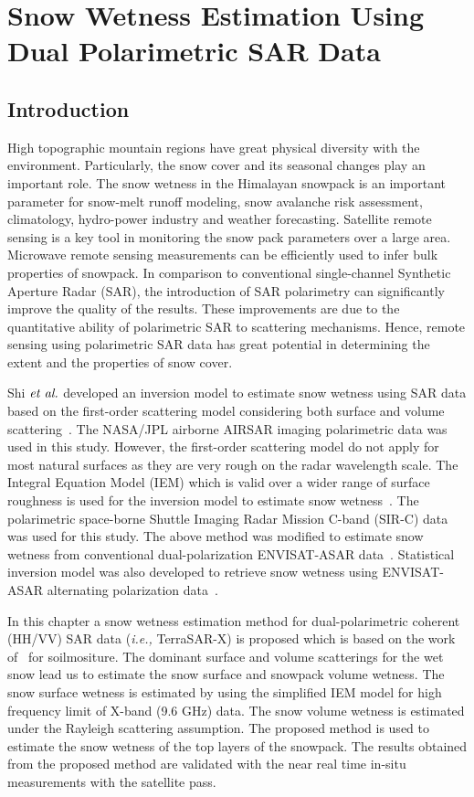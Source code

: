 \chapter{Snow Wetness Estimation Using Dual Polarimetric SAR Data}
\section{Introduction}
High topographic mountain regions have great physical diversity with the environment. Particularly, the snow cover and its seasonal changes play an important role. The snow wetness in the Himalayan snowpack is an important parameter for snow-melt runoff modeling, snow avalanche risk assessment, climatology, hydro-power industry and weather forecasting. Satellite remote sensing is a key tool in monitoring the snow pack parameters over a large area. Microwave remote sensing measurements can be efficiently used to infer bulk properties of snowpack. In comparison to conventional single-channel Synthetic Aperture Radar (SAR), the introduction of SAR polarimetry can significantly improve the quality of the results.
These improvements are due to the quantitative ability of polarimetric SAR to scattering mechanisms. Hence, remote sensing using polarimetric SAR data has great potential in determining the extent and the properties of snow cover.

Shi $\emph{et al.}$ developed an inversion model to estimate snow wetness using SAR data based on the first-order scattering model considering both surface and volume scattering~\cite{Shi93}. The NASA/JPL airborne AIRSAR imaging polarimetric data was used in this study. However, the first-order scattering model do not apply for most natural surfaces as they are very rough on the radar wavelength scale. The Integral Equation Model (IEM) which is valid over a wider range of surface roughness is used for the inversion model to estimate snow wetness~\cite{Shi95}. The polarimetric space-borne Shuttle Imaging Radar Mission C-band (SIR-C) data was used for this study. The above method was modified to estimate snow wetness from conventional dual-polarization ENVISAT-ASAR data~\cite{Singh2010}. Statistical inversion model was also developed to retrieve snow wetness using ENVISAT-ASAR alternating polarization data~\cite{niang2007new}.

In this chapter a snow wetness estimation method for dual-polarimetric coherent (HH/VV) SAR data (\emph{i.e.,} TerraSAR-X) is proposed which is based on the work of~\cite{jagdhuber2013polarimetric} for soilmositure. The dominant surface and volume scatterings for the wet snow lead us to estimate the snow surface and snowpack volume wetness. The snow surface wetness is estimated by using the simplified IEM model for high frequency limit of X-band (9.6 GHz) data. The snow volume wetness is estimated under the Rayleigh scattering assumption. The proposed method is used to estimate the snow wetness of the top layers of the snowpack. The results obtained from the proposed method are validated with the near real time in-situ measurements with the satellite pass.

